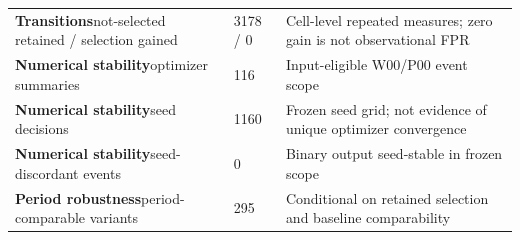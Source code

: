 \begin{longtable}{@{}p{}p{}p{}@{}}
\textbf{Transitions}\newline not-selected retained / selection gained & 3178 / 0 & Cell-level repeated measures; zero gain is not observational FPR \\
\textbf{Numerical stability}\newline optimizer summaries & 116 & Input-eligible W00/P00 event scope \\
\textbf{Numerical stability}\newline seed decisions & 1160 & Frozen seed grid; not evidence of unique optimizer convergence \\
\textbf{Numerical stability}\newline seed-discordant events & 0 & Binary output seed-stable in frozen scope \\
\textbf{Period robustness}\newline period-comparable variants & 295 & Conditional on retained selection and baseline comparability \\
\bottomrule
\end{longtable}
